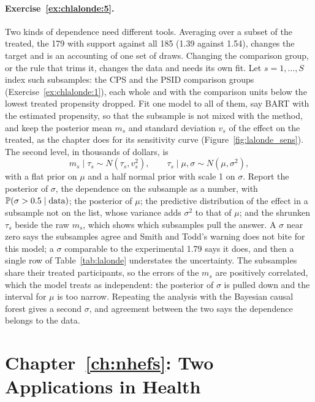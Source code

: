 \paragraph{Exercise~\ref{ex:chlalonde:5}.} Two kinds of dependence need different tools. Averaging over a subset of the treated, the 179 with support against all 185 (1.39 against 1.54), changes the target and is an accounting of one set of draws. Changing the comparison group, or the rule that trims it, changes the data and needs its own fit. Let $s = 1, \ldots, S$ index such subsamples: the CPS and the PSID comparison groups (Exercise~\ref{ex:chlalonde:1}), each whole and with the comparison units below the lowest treated propensity dropped. Fit one model to all of them, say BART with the estimated propensity, so that the subsample is not mixed with the method, and keep the posterior mean $m_s$ and standard deviation $v_s$ of the effect on the treated, as the chapter does for its sensitivity curve (Figure~\ref{fig:lalonde_sens}). The second level, in thousands of dollars, is
\[
m_s \mid \tau_s \sim N(\tau_s, v_s^2), \qquad \tau_s \mid \mu, \sigma \sim N(\mu, \sigma^2),
\]
with a flat prior on $\mu$ and a half normal prior with scale 1 on $\sigma$. Report the posterior of $\sigma$, the dependence on the subsample as a number, with $\mathbb{P}(\sigma > 0.5 \mid \text{data})$; the posterior of $\mu$; the predictive distribution of the effect in a subsample not on the list, whose variance adds $\sigma^2$ to that of $\mu$; and the shrunken $\tau_s$ beside the raw $m_s$, which shows which subsamples pull the answer. A $\sigma$ near zero says the subsamples agree and Smith and Todd's warning does not bite for this model; a $\sigma$ comparable to the experimental 1.79 says it does, and then a single row of Table~\ref{tab:lalonde} understates the uncertainty. The subsamples share their treated participants, so the errors of the $m_s$ are positively correlated, which the model treats as independent: the posterior of $\sigma$ is pulled down and the interval for $\mu$ is too narrow. Repeating the analysis with the Bayesian causal forest gives a second $\sigma$, and agreement between the two says the dependence belongs to the data.

\section*{Chapter~\ref{ch:nhefs}: Two Applications in Health}

